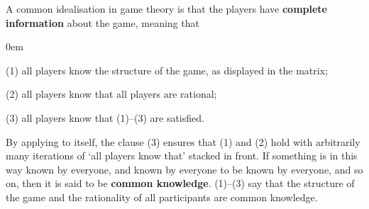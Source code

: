 A common idealisation in game theory is that the players have \textbf{complete
  information} about the game, meaning that
\begin{enumerate*}
  \itemsep0em
  \item[(1)] all players know the structure of the game, as displayed in the
  matrix;
  \item[(2)] all players know that all players are rational;
  \item[(3)] all players know that (1)--(3) are satisfied.
\end{enumerate*}
By applying to itself, the clause (3) ensures that (1) and (2) hold with
arbitrarily many iterations of `all players know that' stacked in front. If
something is in this way known by everyone, and known by everyone to be known by
everyone, and so on, then it is said to be \textbf{common knowledge}. (1)--(3)
say that the structure of the game and the rationality of all participants are
common knowledge.

